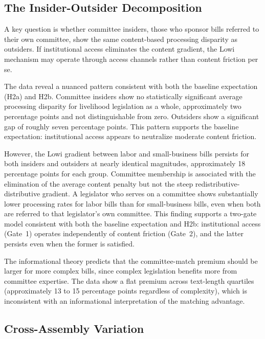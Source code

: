 \documentclass[11pt]{article}
\begin{document}
\subsection{The Insider-Outsider Decomposition}
\label{sec:results-insider}

A key question is whether committee insiders, those who sponsor bills referred to their own committee, show the same content-based processing disparity as outsiders. If institutional access eliminates the content gradient, the Lowi mechanism may operate through access channels rather than content friction per se.

The data reveal a nuanced pattern consistent with both the baseline expectation (H2a) and H2b. Committee insiders show no statistically significant average processing disparity for livelihood legislation as a whole, approximately two percentage points and not distinguishable from zero. Outsiders show a significant gap of roughly seven percentage points. This pattern supports the baseline expectation: institutional access appears to neutralize moderate content friction.

However, the Lowi gradient between labor and small-business bills persists for both insiders and outsiders at nearly identical magnitudes, approximately 18 percentage points for each group. Committee membership is associated with the elimination of the average content penalty but not the steep redistributive-distributive gradient. A legislator who serves on a committee shows substantially lower processing rates for labor bills than for small-business bills, even when both are referred to that legislator's own committee. This finding supports a two-gate model consistent with both the baseline expectation and H2b: institutional access (Gate~1) operates independently of content friction (Gate~2), and the latter persists even when the former is satisfied.

The informational theory \citep{krehbiel1991} predicts that the committee-match premium should be larger for more complex bills, since complex legislation benefits more from committee expertise. The data show a flat premium across text-length quartiles (approximately 13 to 15 percentage points regardless of complexity), which is inconsistent with an informational interpretation of the matching advantage.

\subsection{Cross-Assembly Variation}
\label{sec:results-cross}
\end{document}
